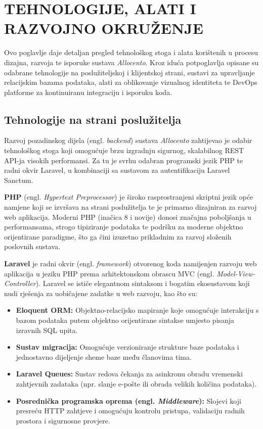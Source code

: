 \documentclass[a4paper,12pt,oneside]{article}
\begin{document}
	\newpage
	
	
	\section{TEHNOLOGIJE, ALATI I RAZVOJNO OKRUŽENJE}
	
	Ovo poglavlje daje detaljan pregled tehnološkog stoga i alata korištenih u procesu dizajna, razvoja te isporuke sustava \textit{Allocento}. Kroz iduća potpoglavlja opisane su odabrane tehnologije na poslužiteljskoj i klijentskoj strani, sustavi za upravljanje relacijskim bazama podataka, alati za oblikovanje vizualnog identiteta te DevOps platforme za kontinuiranu integraciju i isporuku koda.
	
	\subsection{Tehnologije na strani poslužitelja}
	Razvoj pozadinskog dijela (engl. \textit{backend}) sustava \textit{Allocento} zahtijevao je odabir tehnološkog stoga koji omogućuje brzu izgradnju sigurnog, skalabilnog REST API-ja visokih performansi. Za tu je svrhu odabran programski jezik PHP te radni okvir Laravel, u kombinaciji sa sustavom za autentifikaciju Laravel Sanctum.
	
	\textbf{PHP} (engl. \textit{Hypertext Preprocessor}) je široko rasprostranjeni skriptni jezik opće namjene koji se izvršava na strani poslužitelja te je primarno dizajniran za razvoj web aplikacija. Moderni PHP (inačica 8 i novije) donosi značajna poboljšanja u performansama, strogo tipiziranje podataka te podršku za moderne objektno orijentirane paradigme, što ga čini izuzetno prikladnim za razvoj složenih poslovnih sustava.
	
	\textbf{Laravel} je radni okvir (engl. \textit{framework}) otvorenog koda namijenjen razvoju web aplikacija u jeziku PHP prema arhitektonskom obrascu MVC (engl. \textit{Model-View-Controller}). Laravel se ističe elegantnom sintaksom i bogatim ekosustavom koji nudi rješenja za uobičajene zadatke u web razvoju, kao što su:
	\begin{itemize}
		\item \textbf{Eloquent ORM:} Objektno-relacijsko mapiranje koje omogućuje interakciju s bazom podataka putem objektno orijentirane sintakse umjesto pisanja izravnih SQL upita.
		
		\item \textbf{Sustav migracija:} Omogućuje verzioniranje strukture baze podataka i jednostavno dijeljenje sheme baze među članovima tima.
		
		\item \textbf{Laravel Queues:} Sustav redova čekanja za asinkronu obradu vremenski zahtjevnih zadataka (npr. slanje e-pošte ili obrada velikih količina podataka).
		
		\item \textbf{Posrednička programska oprema (engl. \textit{Middleware}):} Slojevi koji presreću HTTP zahtjeve i omogućuju kontrolu pristupa, validaciju radnih prostora i sigurnosne provjere.
	\end{itemize}
	
\end{document}
